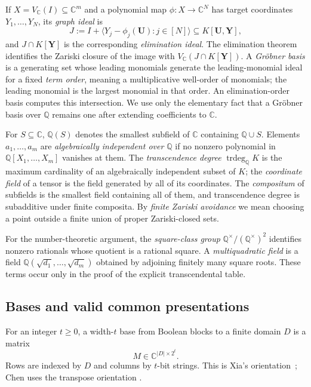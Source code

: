 \documentclass[11pt]{article}
\theoremstyle{definition}
\theoremstyle{remark}
\newcommand{\C}{\mathbb C}
\newcommand{\Q}{\mathbb Q}
\newcommand{\trdeg}{\operatorname{trdeg}}
\begin{document}
If $X=V_{\C}(I)\subseteq\C^m$ and a polynomial map
$\phi:X\to\C^N$ has target coordinates $Y_1,\ldots,Y_N$, its
\emph{graph ideal} is
\[
  J:=I+\langle Y_j-\phi_j(\mathbf U):j\in[N]\rangle
  \subseteq K[\mathbf U,\mathbf Y],
\]
and $J\cap K[\mathbf Y]$ is the corresponding \emph{elimination ideal}.
The elimination theorem identifies the Zariski closure of the image with
$V_{\C}(J\cap K[\mathbf Y])$.  A \emph{Gr\"obner basis} is a generating
set whose leading monomials generate the leading-monomial ideal for a fixed
\emph{term order}, meaning a multiplicative well-order of monomials; the
leading monomial is the largest monomial in that order.  An
elimination-order basis computes this intersection.  We use
only the elementary fact that a Gr\"obner basis over $\Q$ remains one after
extending coefficients to $\C$.

For $S\subseteq\C$, $\Q(S)$ denotes the smallest subfield of $\C$
containing $\Q\cup S$.  Elements $a_1,\ldots,a_m$ are \emph{algebraically
independent over $\Q$} if no nonzero polynomial in
$\Q[X_1,\ldots,X_m]$ vanishes at them.  The \emph{transcendence degree}
$\trdeg_{\Q}K$ is the maximum cardinality of an algebraically independent
subset of $K$; the \emph{coordinate field} of a tensor is the field
generated by all of its coordinates.  The \emph{compositum} of subfields
is the smallest field containing all of them, and transcendence degree is
subadditive under finite composita.  By \emph{finite Zariski avoidance} we
mean choosing a point outside a finite union of proper Zariski-closed
sets.

For the number-theoretic argument, the \emph{square-class group}
$\Q^\times/(\Q^\times)^2$ identifies nonzero rationals whose quotient is a
rational square.  A \emph{multiquadratic field} is a field
$\Q(\sqrt{d_1},\ldots,\sqrt{d_m})$ obtained by adjoining finitely many
square roots.  These terms occur only in the proof of the explicit
transcendental table.

\subsection{Bases and valid common presentations}
\label{sec:base-presentation}

For an integer $t\ge0$, a width-$t$ base from Boolean blocks to a finite
domain $D$ is a matrix
\begin{equation}
  M\in\C^{|D|\times2^t}.
  \label{eq:xia-base}
\end{equation}
Rows are indexed by $D$ and columns by $t$-bit strings.  This is Xia's
orientation~\cite{Xia2016}; Chen uses the transpose orientation
\cite{Chen2016}.
\end{document}
